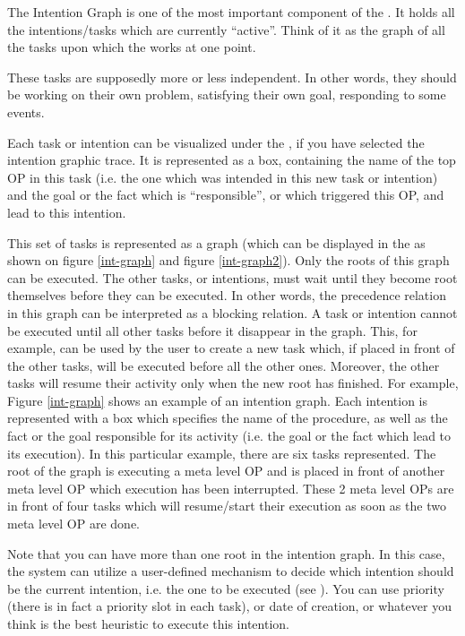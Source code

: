 The Intention Graph is one of the most important component of the \CPK{}.
It holds all the intentions/tasks which are currently ``active''. Think of
it as the graph of all the tasks upon which the \CPK{} works at one point.

These tasks are supposedly more or less independent. In other words, they
should be working on their own problem, satisfying their own goal, responding
to some events.




Each task or intention can be visualized under the \XPK{}, if you have selected
the intention graphic trace. It is represented as a box, containing the name of
the top OP in this task (i.e. the one which was intended in this new task or
intention) and the goal or the fact which is ``responsible'', or which
triggered this OP, and lead to this intention.

This set of tasks is represented as a graph (which can be displayed in the
\XOPRS{} as shown on figure \ref{int-graph} and figure \ref{int-graph2}). Only
the roots of this graph can be executed. The other tasks, or intentions, must
wait until they become root themselves before they can be executed. In other
words, the precedence relation in this graph can be interpreted as a blocking
relation. A task or intention cannot be executed until all other tasks before
it disappear in the graph.  This, for example, can be used by the user to
create a new task which, if placed in front of the other tasks, will be
executed before all the other ones.  Moreover, the other tasks will resume
their activity only when the new root has finished. For example, Figure
\ref{int-graph} shows an example of an intention graph. Each intention is
represented with a box which specifies the name of the procedure, as well as
the fact or the goal responsible for its activity (i.e. the goal or the fact
which lead to its execution). In this particular example, there are six tasks
represented. The root of the graph is executing a meta level OP and is placed
in front of another meta level OP which execution has been interrupted. These 2
meta level OPs are in front of four tasks which will resume/start their
execution as soon as the two meta level OP are done.

Note that you can have more than one root in the intention graph. In this
case, the system can utilize a user-defined mechanism to decide which
intention should be the current intention, i.e. the one to be executed
(see ). You can use priority
(there is in fact a priority slot in each task), or date of creation, or
whatever you think is the best heuristic to execute this intention.

